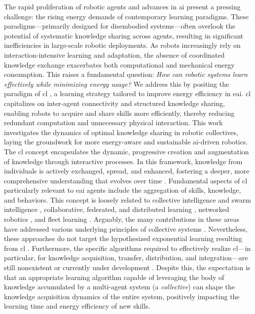 \documentclass[12pt]{article}
\begin{document}
The rapid proliferation of robotic agents and advances in \ac{ai} present a pressing challenge: the rising energy demands of contemporary learning paradigms. These paradigms---primarily designed for disembodied systems---often overlook the potential of systematic knowledge sharing across agents, resulting in significant inefficiencies in large-scale robotic deployments. As robots increasingly rely on interaction-intensive learning and adaptation, the absence of coordinated knowledge exchange exacerbates both computational and mechanical energy consumption. This raises a fundamental question: \emph{How can robotic systems learn effectively while minimizing energy usage?} We address this by positing the paradigm of \acl{cl} \cite{Haddadin2014SystemzumErstellen,Haddadin2015Systemgeneratingsets}, a learning strategy tailored to improve energy efficiency in \ac{eai}. \Ac{cl} capitalizes on inter-agent connectivity and structured knowledge sharing, enabling robots to acquire and share skills more efficiently, thereby reducing redundant computation and unnecessary physical interaction. This work investigates the dynamics of optimal knowledge sharing in robotic collectives, laying the groundwork for more energy-aware and sustainable \ac{ai}-driven robotics. The \ac{cl} concept encapsulates the dynamic, progressive creation and augmentation of knowledge through interactive processes. In this framework, knowledge from individuals is actively exchanged, spread, and enhanced, fostering a deeper, more comprehensive understanding that evolves over time \cite{Garavan2012CollectiveLearning}. Fundamental aspects of \ac{cl} particularly relevant to \ac{eai} agents include the aggregation of skills, knowledge, and behaviors. This concept is loosely related to collective intelligence and swarm intelligence \cite{Beni2004SwarmIntelligenceSwarm,Blum2015SwarmIntelligenceOptimization,Dorigo2021SwarmRoboticsPast}, collaborative, federated, and distributed learning \cite{Technologie2023FLAIROPFederatedLearning,Anjos2023SurveyCollaborativeLearning,Xianjia2021Federatedlearningrobotic,Sartoretti2019DistributedLearningDecentralized,Sartoretti2018DistributedLearningDecentralized,Wang2022DistributedReinforcementLearning}, networked robotics \cite{Kumar2008NetworkedRobots}, and fleet learning \cite{Wang2023RobotFleetLearning}. Arguably, the many contributions in these areas have addressed various underlying principles of collective systems \cite{Kernbach2013HandbookCollectiveRobotics}. Nevertheless, these approaches do not target the hypothesized exponential learning resulting from \ac{cl} \cite{Haddadin2019Breakingwallcollective}. Furthermore, the specific algorithms required to effectively realize \ac{cl}---in particular, for knowledge acquisition, transfer, distribution, and integration---are still nonexistent or currently under development \cite{Haddadin2022collectivelearningtheory}. Despite this, the expectation is that an appropriate learning algorithm capable of leveraging the body of knowledge accumulated by a multi-agent system (a \emph{collective}) can shape the knowledge acquisition dynamics of the entire system, positively impacting the learning time and energy efficiency of new skills.
\end{document}
